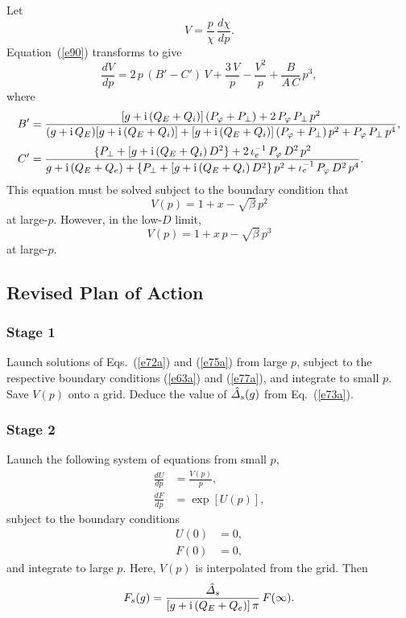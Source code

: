 \documentclass[titlepage=false,12pt]{article}
\begin{document}
Let 
\begin{equation}
V= \frac{p}{\chi}\,\frac{d\chi}{dp}.
\end{equation}
Equation~(\ref{e90}) transforms to give 
\begin{equation}\label{e75a}
\frac{dV}{dp} = 2\,p\,(B'-C')\,V + \frac{3\,V}{p} - \frac{V^2}{p} + \frac{B}{A\,C}\,p^3,
\end{equation}
where 
\begin{align}
B' &= \frac{ [g+{\rm i}\,(Q_E+Q_i)]\,(P_\varphi+P_\perp)+ 2\,P_\varphi\,P_\perp\,p^2}{ (g+{\rm i}\,Q_E)[g+{\rm i}\,(Q_E+Q_i)] + [g+{\rm i}\,(Q_E+Q_i)]\,(P_\varphi+P_\perp)\,p^2+ P_\varphi\,P_\perp\,p^4},\\[0.5ex]
C'&=\frac{\{P_\perp + [g+{\rm i}\,(Q_E+Q_i)\,D^2\}+ 2\,\iota_e^{-1}\,P_\varphi\,D^2\,p^2}{g + {\rm i}\,(Q_E+Q_e) +\{P_\perp + [g+{\rm i}\,(Q_E+Q_i)\,D^2\}\,p^2 + \iota_e^{-1}\,P_\varphi\,D^2\,p^4}.
\end{align}
This equation must be solved subject to the boundary condition that
\begin{equation}\label{e77a}
V(p) = 1+x-\sqrt{\beta}\,p^2
\end{equation}
at large-$p$. 
However, in the low-$D$ limit,
\begin{equation}\label{e63aa}
V(p) = 1 +x\,p-\sqrt{\beta}\,p^3
\end{equation}
at large-$p$. 


\subsection{Revised Plan of Action}
\subsubsection{Stage 1}
Launch solutions of Eqs.~(\ref{e72a}) and (\ref{e75a}) from large $p$, subject to the respective boundary conditions (\ref{e63a}) and (\ref{e77a}), and
integrate to small $p$. Save $V(p)$ onto a grid. Deduce the value of $\hat{\mit\Delta}_s(g)$ from Eq.~(\ref{e73a}). 

\subsubsection{Stage 2}
Launch the following system of equations from small $p$, 
\begin{align}
\frac{dU}{dp} &= \frac{V(p)}{p},\\[0.5ex]
\frac{dF}{dp} &=\exp[U(p)],
\end{align}
subject to the boundary conditions
\begin{align}
U(0) &=0,\\[0.5ex]
F(0) &= 0,
\end{align}
and integrate to large $p$. Here, $V(p)$ is interpolated from the grid. 
Then
\begin{equation}
F_s(g) = \frac{\hat{\mit\Delta}_s}{[g+{\rm i}\,(Q_E+Q_e)]\,\pi}\, F(\infty).
\end{equation}
\end{document}
